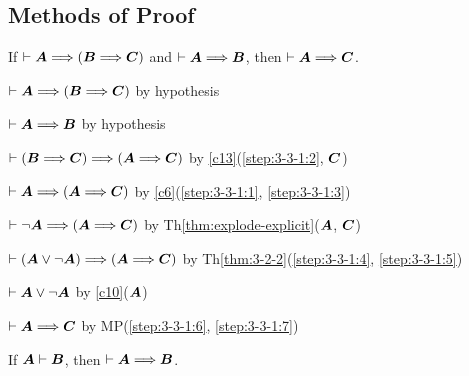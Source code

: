 \subsection{Methods of Proof}

\begin{lemma}\label{lemma:hypothetical-syllogism}
If $\vdash\boldsymbol{A}\Longrightarrow(\boldsymbol{B}\Longrightarrow\boldsymbol{C})$
and $\vdash\boldsymbol{A}\Longrightarrow\boldsymbol{B}$,
then $\vdash\boldsymbol{A}\Longrightarrow\boldsymbol{C}$.
\end{lemma}

\begin{pf}
\item\label{step:3-3-1:1} $\vdash\boldsymbol{A}\Longrightarrow(\boldsymbol{B}\Longrightarrow\boldsymbol{C})$
  by hypothesis
\item\label{step:3-3-1:2} $\vdash\boldsymbol{A}\Longrightarrow\boldsymbol{B}$
  by hypothesis
\item\label{step:3-3-1:3} $\vdash(\boldsymbol{B}\Longrightarrow\boldsymbol{C})\Longrightarrow(\boldsymbol{A}\Longrightarrow\boldsymbol{C})$
  by \ref{c13}(\ref{step:3-3-1:2}, $\boldsymbol{C}$)
\item\label{step:3-3-1:4} $\vdash\boldsymbol{A}\Longrightarrow(\boldsymbol{A}\Longrightarrow\boldsymbol{C})$
  by \ref{c6}(\ref{step:3-3-1:1}, \ref{step:3-3-1:3})
\item\label{step:3-3-1:5} $\vdash\neg\boldsymbol{A}\Longrightarrow(\boldsymbol{A}\Longrightarrow\boldsymbol{C})$
  by Th\ref{thm:explode-explicit}($\boldsymbol{A}$, $\boldsymbol{C}$)
\item\label{step:3-3-1:6} $\vdash(\boldsymbol{A}\lor\neg\boldsymbol{A})\Longrightarrow(\boldsymbol{A}\Longrightarrow\boldsymbol{C})$
  by Th\ref{thm:3-2-2}(\ref{step:3-3-1:4}, \ref{step:3-3-1:5})
\item\label{step:3-3-1:7} $\vdash\boldsymbol{A}\lor\neg\boldsymbol{A}$
  by \ref{c10}($\boldsymbol{A}$)
\item\label{step:3-3-1:8} $\vdash\boldsymbol{A}\Longrightarrow\boldsymbol{C}$
  by MP(\ref{step:3-3-1:6}, \ref{step:3-3-1:7})
\end{pf}

\begin{dc}\label{c14}
If $\boldsymbol{A}\vdash\boldsymbol{B}$, then $\vdash\boldsymbol{A}\Longrightarrow\boldsymbol{B}$.
\end{dc}

